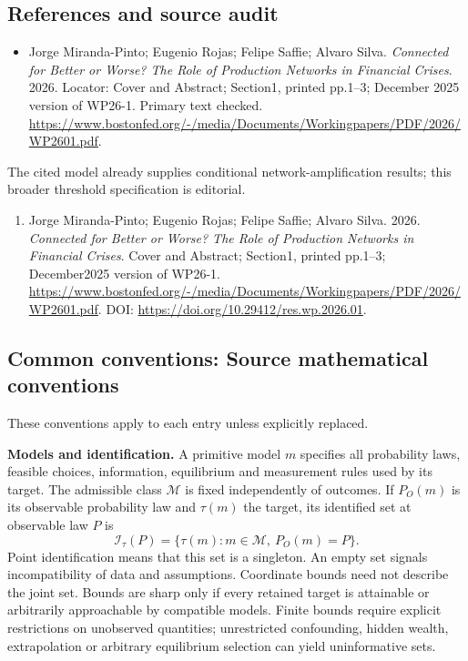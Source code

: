 \documentclass[11pt,a4paper]{article}
\begin{document}
\subsection*{References and source audit}
\begin{itemize}
\item Jorge Miranda-Pinto; Eugenio Rojas; Felipe Saffie; Alvaro Silva. \emph{Connected for Better or Worse? The Role of Production Networks in Financial Crises}. 2026. Locator: Cover and Abstract; Section1, printed pp.1--3; December 2025 version of WP26-1. Primary text checked. \url{https://www.bostonfed.org/-/media/Documents/Workingpapers/PDF/2026/WP2601.pdf}.
\end{itemize}
The cited model already supplies conditional network-amplification results; this broader threshold specification is editorial.
\begin{enumerate}\raggedright
\item\hypertarget{definitions:source:30007513:1}{} Jorge Miranda-Pinto; Eugenio Rojas; Felipe Saffie; Alvaro Silva. 2026. \emph{Connected for Better or Worse? The Role of Production Networks in Financial Crises}. Cover and Abstract; Section1, printed pp.1--3; December2025 version of WP26-1.
\url{https://www.bostonfed.org/-/media/Documents/Workingpapers/PDF/2026/WP2601.pdf}.
DOI: \url{https://doi.org/10.29412/res.wp.2026.01}.
\end{enumerate}

\subsection*{Common conventions: Source mathematical conventions}

These conventions apply to each entry unless explicitly replaced.

\textbf{Models and identification.} A primitive model \(m\) specifies all probability laws, feasible choices, information, equilibrium and measurement rules used by its target. The admissible class \(\mathcal M\) is fixed independently of outcomes. If \(P_O(m)\) is its observable probability law and \(\tau(m)\) the target, its identified set at observable law \(P\) is
\[
 \mathcal I_\tau(P)=\{\tau(m):m\in\mathcal M,\ P_O(m)=P\}.
\]
Point identification means that this set is a singleton. An empty set signals incompatibility of data and assumptions. Coordinate bounds need not describe the joint set. Bounds are sharp only if every retained target is attainable or arbitrarily approachable by compatible models. Finite bounds require explicit restrictions on unobserved quantities; unrestricted confounding, hidden wealth, extrapolation or arbitrary equilibrium selection can yield uninformative sets.
\end{document}
